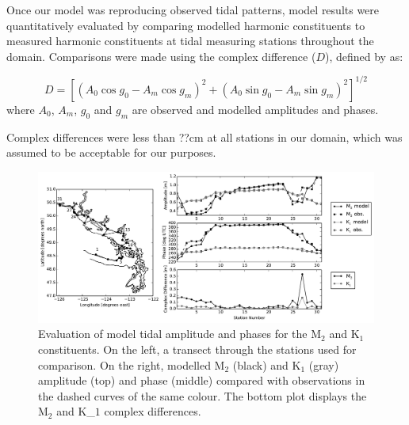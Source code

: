 \documentclass[pdftex,10pt]{article}
\begin{document}

Once our model was reproducing observed tidal patterns, model results were quantitatively evaluated by comparing modelled harmonic constituents to measured harmonic constituents at tidal measuring stations throughout the domain. Comparisons were made using the complex difference ($D$), defined by \citep{foreman1995tidal} as:

\begin{equation}
D = [(A_0 \cos g_0 - A_m \cos g_m)^2 + (A_0 \sin g_0 - A_m \sin g_m)^2]^{1/2}
\end{equation}\label{eq:compdiff}
where $A_0$, $A_m$, $g_0$ and $g_m$ are observed and modelled amplitudes and phases.




Complex differences were less than ??cm at all stations in our domain, which was assumed to be acceptable for our purposes. 

\begin{figure}
\centering
\includegraphics[scale=0.6]{Figures/tides.pdf}
\caption{Evaluation of model tidal amplitude and phases for the M$_2$ and K$_1$ constituents. On the left, a transect through the stations used for comparison. On the right, modelled M$_2$ (black) and K$_1$ (gray) amplitude (top) and phase (middle) compared with observations in the dashed curves of the same colour. The bottom plot displays the M$_2$ and K_$1$ complex differences.  }
\label{fig:tides}
\end{figure}
\end{document}
